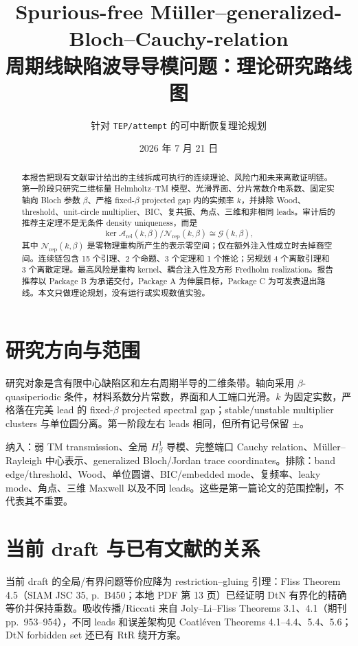 \documentclass[UTF8,11pt,fontset=none]{ctexart}
\title{\bfseries Spurious-free Müller--generalized-Bloch--Cauchy-relation\\
周期线缺陷波导导模问题：理论研究路线图}
\author{针对 \texttt{TEP/attempt} 的可中断恢复理论规划}
\date{2026 年 7 月 21 日}
\theoremstyle{definition}
\newcommand{\G}{\mathcal G(k,\beta)}
\newcommand{\Arel}{\mathcal A_{\mathrm{rel}}(k,\beta)}
\newcommand{\Nrep}{\mathcal N_{\mathrm{rep}}(k,\beta)}
\begin{document}
\maketitle

\begin{abstract}
本报告把现有文献审计给出的主线拆成可执行的连续理论、风险门和未来离散证明链。第一阶段只研究二维标量 Helmholtz--TM 模型、光滑界面、分片常数介电系数、固定实轴向 Bloch 参数 $\beta$、严格 fixed-$\beta$ projected gap 内的实频率 $k$，并排除 Wood、threshold、unit-circle multiplier、BIC、复共振、角点、三维和非相同 leads。审计后的推荐主定理不是无条件 density uniqueness，而是
\[
 \ker\Arel/\Nrep\cong\G,
\]
其中 $\Nrep$ 是零物理重构所产生的表示零空间；仅在额外注入性成立时去掉商空间。连续链包含 15 个引理、2 个命题、3 个定理和 1 个推论；另规划 4 个离散引理和 3 个离散定理。最高风险是重构 kernel、耦合注入性及方形 Fredholm realization。报告推荐以 Package B 为承诺交付，Package A 为伸展目标，Package C 为可发表退出路线。本文只做理论规划，没有运行或实现数值实验。
\end{abstract}

\tableofcontents
\clearpage

\section{研究方向与范围}

研究对象是含有限中心缺陷区和左右周期半导的二维条带。轴向采用 $\beta$-quasiperiodic 条件，材料系数分片常数，界面和人工端口光滑。$k$ 为固定实数，严格落在完美 lead 的 fixed-$\beta$ projected spectral gap；stable/unstable multiplier clusters 与单位圆分离。第一阶段左右 leads 相同，但所有记号保留 $\pm$。

纳入：弱 TM transmission、全局 $H^1_\beta$ 导模、完整端口 Cauchy relation、Müller--Rayleigh 中心表示、generalized Bloch/Jordan trace coordinates。排除：band edge/threshold、Wood、单位圆谱、BIC/embedded mode、复频率、leaky mode、角点、三维 Maxwell 以及不同 leads。这些是第一篇论文的范围控制，不代表其不重要。

\section{当前 draft 与已有文献的关系}

当前 draft 的全局/有界问题等价应降为 restriction--gluing 引理：Fliss Theorem 4.5（SIAM JSC 35, p.~B450；本地 PDF 第 13 页）已经证明 DtN 有界化的精确等价并保持重数\cite{Fliss2013}。吸收传播/Riccati 来自 Joly--Li--Fliss Theorems 3.1、4.1（期刊 pp.~953--954）\cite{JolyLiFliss2006}，不同 leads 和误差架构见 Coatléven Theorems 4.1--4.4、5.4、5.6\cite{Coatleven2012}；DtN forbidden set 还已有 RtR 绕开方案\cite{FlissKlindworthSchmidt2015}。
\end{document}
